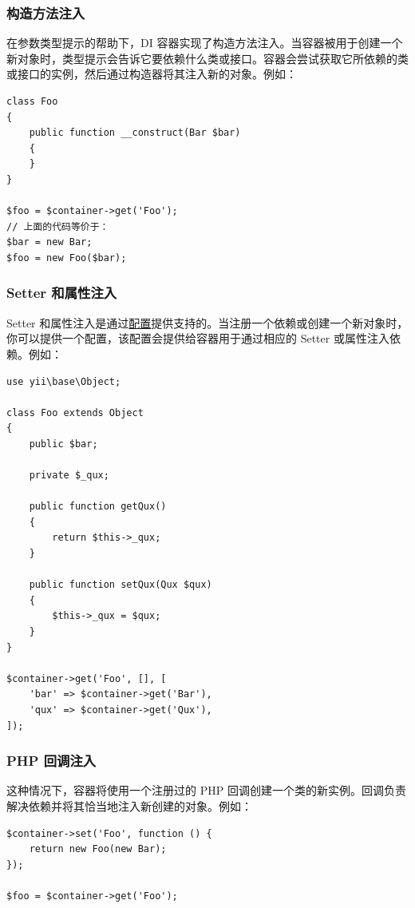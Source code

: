 \subsubsection{构造方法注入 \label{concept-di-container.md::constructor-injection}}
在参数类型提示的帮助下，DI 容器实现了构造方法注入。当容器被用于创建一个新对象时，类型提示会告诉它要依赖什么类或接口。容器会尝试获取它所依赖的类或接口的实例，然后通过构造器将其注入新的对象。例如：

\lstset{language=php}\begin{lstlisting}
class Foo
{
    public function __construct(Bar $bar)
    {
    }
}

$foo = $container->get('Foo');
// 上面的代码等价于：
$bar = new Bar;
$foo = new Foo($bar);
\end{lstlisting}
\subsubsection{Setter 和属性注入 \label{concept-di-container.md::setter-and-property-injection}}
Setter 和属性注入是通过\hyperref[concept-configurations.md]{配置}提供支持的。当注册一个依赖或创建一个新对象时，你可以提供一个配置，该配置会提供给容器用于通过相应的 Setter 或属性注入依赖。例如：

\lstset{language=php}\begin{lstlisting}
use yii\base\Object;

class Foo extends Object
{
    public $bar;

    private $_qux;

    public function getQux()
    {
        return $this->_qux;
    }

    public function setQux(Qux $qux)
    {
        $this->_qux = $qux;
    }
}

$container->get('Foo', [], [
    'bar' => $container->get('Bar'),
    'qux' => $container->get('Qux'),
]);
\end{lstlisting}
\subsubsection{PHP 回调注入 \label{concept-di-container.md::php-callable-injection}}
这种情况下，容器将使用一个注册过的 PHP 回调创建一个类的新实例。回调负责解决依赖并将其恰当地注入新创建的对象。例如：

\lstset{language=php}\begin{lstlisting}
$container->set('Foo', function () {
    return new Foo(new Bar);
});

$foo = $container->get('Foo');
\end{lstlisting}
